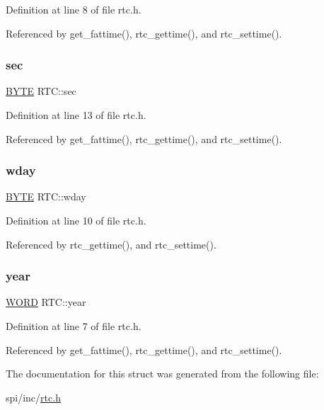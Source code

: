 Definition at line 8 of file rtc.\+h.



Referenced by get\+\_\+fattime(), rtc\+\_\+gettime(), and rtc\+\_\+settime().

\mbox{\label{structRTC_a4e9dca93b2215d13696ea8c92755c05a}} 
\subsubsection{\texorpdfstring{sec}{sec}}
{\footnotesize\ttfamily \hyperlink{lz4_8c_a4ae1dab0fb4b072a66584546209e7d58}{B\+Y\+TE} R\+T\+C\+::sec}



Definition at line 13 of file rtc.\+h.



Referenced by get\+\_\+fattime(), rtc\+\_\+gettime(), and rtc\+\_\+settime().

\mbox{\label{structRTC_ae5f840070c223cdc4c1d5279934bae1a}} 
\subsubsection{\texorpdfstring{wday}{wday}}
{\footnotesize\ttfamily \hyperlink{lz4_8c_a4ae1dab0fb4b072a66584546209e7d58}{B\+Y\+TE} R\+T\+C\+::wday}



Definition at line 10 of file rtc.\+h.



Referenced by rtc\+\_\+gettime(), and rtc\+\_\+settime().

\mbox{\label{structRTC_acb5071073b17bef18e2e0c0cf10900e1}} 
\subsubsection{\texorpdfstring{year}{year}}
{\footnotesize\ttfamily \hyperlink{integer_8h_a197942eefa7db30960ae396d68339b97}{W\+O\+RD} R\+T\+C\+::year}



Definition at line 7 of file rtc.\+h.



Referenced by get\+\_\+fattime(), rtc\+\_\+gettime(), and rtc\+\_\+settime().



The documentation for this struct was generated from the following file\+:\begin{DoxyCompactItemize}
\item 
spi/inc/\hyperlink{rtc_8h}{rtc.\+h}\end{DoxyCompactItemize}
